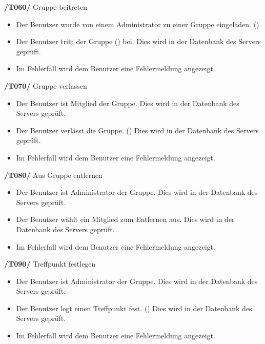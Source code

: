 \begin{itemize}
\begin{itemize}
\textbf{/T060/} Gruppe beitreten \\
\begin{itemize}
\setlength{\itemsep}{0pt}
\item Der Benutzer wurde von einem Administrator zu einer Gruppe eingeladen. ()
\item Der Benutzer tritt der Gruppe () bei. Dies wird in der Datenbank des Servers geprüft.
\item Im Fehlerfall wird dem Benutzer eine Fehlermeldung angezeigt.
\end{itemize}


\textbf{/T070/} Gruppe verlassen \\
\begin{itemize}
\setlength{\itemsep}{0pt}
\item Der Benutzer ist Mitglied der Gruppe. Dies wird in der Datenbank des Servers geprüft.
\item Der Benutzer verlässt die Gruppe. () Dies wird in der Datenbank des Servers geprüft.
\item Im Fehlerfall wird dem Benutzer eine Fehlermeldung angezeigt.
\end{itemize}


\textbf{/T080/} Aus Gruppe entfernen \\
\begin{itemize}
\setlength{\itemsep}{0pt}
\item Der Benutzer ist Administrator der Gruppe. Dies wird in der Datenbank des Servers geprüft.
\item Der Benutzer wählt ein Mitglied zum Entfernen aus. Dies wird in der Datenbank des Servers geprüft.
\item Im Fehlerfall wird dem Benutzer eine Fehlermeldung angezeigt.
\end{itemize}


\textbf{/T090/} Treffpunkt festlegen \\
\begin{itemize}
\setlength{\itemsep}{0pt}
\item Der Benutzer ist Administrator der Gruppe. Dies wird in der Datenbank des Servers geprüft.
\item Der Benutzer legt einen Treffpunkt fest. () Dies wird in der Datenbank des Servers geprüft.
\item Im Fehlerfall wird dem Benutzer eine Fehlermeldung angezeigt.
\end{itemize}



\end{itemize}
\end{itemize}
